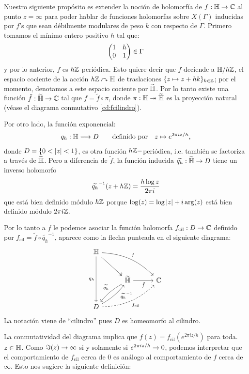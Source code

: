 Nuestro siguiente prop\'osito es extender la noci\'on de holomorf\'ia de $f:\mathbb{H}\rightarrow\mathbb{C}$ al punto
$z=\infty$ para poder hablar de funciones holomorfas sobre $X(\Gamma)$ inducidas por $f$'s que
sean d\'ebilmente modulares de peso $k$ con respecto de $\Gamma$. Primero tomamos el m\'inimo
entero positivo $h$ tal que:
\[
  \begin{pmatrix}1 & h\\ 0 & 1\end{pmatrix}\in\Gamma
\]
y por lo anterior, $f$ es $h\mathbb{Z}$-peri\'odica. Esto quiere decir que $f$ deciende a $\mathbb{H}/h\mathbb{Z}$,
el espacio cociente de la acci\'on $h\mathbb{Z}\curvearrowright\mathbb{H}$ de traslaciones $\{z\mapsto z+hk\}_{k\in\mathbb{Z}}$; por
el momento, denotamos a este espacio cociente por $\widetilde{\HH}$. Por lo tanto existe una
funci\'on $\tilde{f}:\widetilde{\HH}\ra\CC$ tal que $f=\tilde{f}\circ\pi$, donde
$\pi:\HH\epi\widetilde{\HH}$ es la proyecci\'on natural (v\'ease el diagrama conmutativo
\ref{cd:fcilindro}).

Por otro lado, la funci\'on exponencial:
\[
  q_h:\mathbb{H}\longrightarrow D \qquad\text{definido por}\quad z\mapsto e^{2\pi i z/h},
\]
donde $D=\{0<\left| z \right|<1\}$, es otra funci\'on $h\mathbb{Z}-$peri\'odica, i.e. tambi\'en se factoriza a
trav\'es de $\widetilde{\HH}$. Pero a diferencia de $\tilde{f}$, la funci\'on inducida
$\widetilde{q_h}:\widetilde{\HH}\ra D$ tiene un inverso holomorfo
\[
  \widetilde{q_h}^{-1}(z+h\ZZ)=\frac{h\log z}{2\pi i}
\]
que est\'a bien definido m\'odulo $h\mathbb{Z}$ porque $\log(z)=\log\left| z \right|+i\arg(z)$ est\'a bien definido
m\'odulo $2\pi i\mathbb{Z}$.

Por lo tanto a $f$ le podemos asociar la funci\'on holomorfa $f_{\text{cil}}:D\rightarrow\mathbb{C}$ definido por
$f_{\text{cil}}=\tilde{f}\circ\widetilde{q_h}^{-1}$, aparece como la flecha punteada en el siguiente
diagrama:
\begin{equation}\label{cd:fcilindro}
  \begin{tikzcd}[row sep=25,column sep=30]
    \HH \arrow[dd,"q_h"'] \arrow[rrd, bend left=20, "f"] \arrow[dr, twoheadrightarrow] && \\
    &\widetilde{\HH} \arrow[ld, bend right=10,"\widetilde{q_h}"'] \arrow[r, "\tilde{f}"'] & \CC\\
    D \arrow[ru, bend right=10,near end, "\widetilde{q_h}^{-1}"']
    \arrow[rru, bend right=20, dashed,"f_{\text{cil}}"'] &&
  \end{tikzcd}
\end{equation}
La notaci\'on viene de ``cilindro'' pues $D$ es homeomorfo al cilindro.

La conmutatividad del diagrama implica que $f(z)=f_{\mathrm{cil}}(e^{2\pi i z/h})$ para toda.
$z\in\mathbb{H}$. Como $\Im(z)\rightarrow\infty$ si y solamente si $e^{2\pi i z/h}\rightarrow 0$, podemos interpretar que el
comportamiento de $f_{\text{cil}}$ cerca de 0 es an\'alogo al comportamiento de $f$ cerca de $\infty$.
Esto nos sugiere la siguiente definici\'on:

